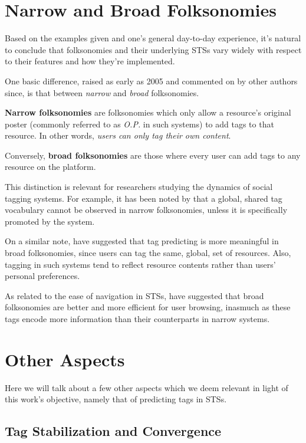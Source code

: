 \section{Narrow and Broad Folksonomies}

Based on the examples given and one's general day-to-day experience, it's natural to conclude that folksonomies and their underlying STSs vary widely with respect to their features and how they're implemented.

One basic difference, raised as early as 2005 \citep{wal_2005_broad_and_narrow} and commented on by other authors \citep{marlow_etal_2006,halpin_etal_2006,peters_2009} since, is that between \textit{narrow} and \textit{broad} folksonomies.

\textbf{Narrow folksonomies} are folksonomies which only allow a resource's original poster (commonly referred to as \textit{O.P.} in such systems) to add tags to that resource. In other words, \textit{users can only tag their own content}.

Conversely, \textbf{broad folksonomies} are those where every user can add tags to any resource on the platform.

This distinction is relevant for researchers studying the dynamics of social tagging systems. For example, it has been noted by \cite{schifanella_etal_2010} that a global, shared tag vocabulary cannot be observed in narrow folksonomies, unless it is specifically promoted by the system.

On a similar note, \cite{aiello_2012} have suggested that tag predicting is more meaningful in broad folksonomies, since users can tag the same, global, set of resources. Also, tagging in such systems tend to reflect resource contents rather than users' personal preferences.

As related to the ease of navigation in STSs, \cite{helic_etal_2012} have suggested that broad folksonomies are better and more efficient for user browsing, inasmuch as these tags encode more information than their counterparts in narrow systems.

\section{Other Aspects}

Here we will talk about a few other aspects which we deem relevant in light of this work's objective, namely that of predicting tags in STSs.

\subsection{Tag Stabilization and Convergence}

